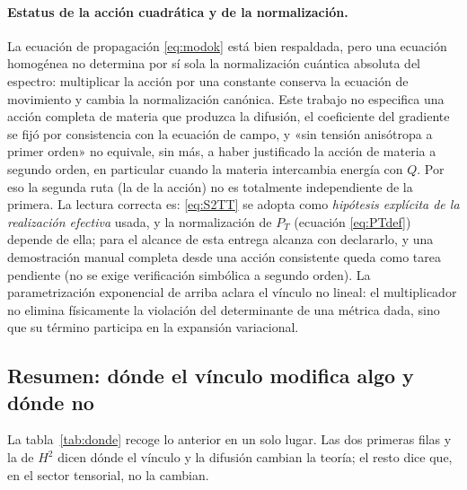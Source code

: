 \paragraph{Estatus de la acción cuadrática y de la normalización.} La ecuación de propagación \eqref{eq:modok} está bien respaldada, pero una ecuación homogénea no determina por sí sola la normalización cuántica absoluta del espectro: multiplicar la acción por una constante conserva la ecuación de movimiento y cambia la normalización canónica. Este trabajo no especifica una acción completa de materia que produzca la difusión, el coeficiente del gradiente se fijó por consistencia con la ecuación de campo, y «sin tensión anisótropa a primer orden» no equivale, sin más, a haber justificado la acción de materia a segundo orden, en particular cuando la materia intercambia energía con $Q$. Por eso la segunda ruta (la de la acción) no es totalmente independiente de la primera. La lectura correcta es: \eqref{eq:S2TT} se adopta como \emph{hipótesis explícita de la realización efectiva} usada, y la normalización de $P_T$ (ecuación \eqref{eq:PTdef}) depende de ella; para el alcance de esta entrega alcanza con declararlo, y una demostración manual completa desde una acción consistente queda como tarea pendiente (no se exige verificación simbólica a segundo orden). La parametrización exponencial de arriba aclara el vínculo no lineal: el multiplicador no elimina físicamente la violación del determinante de una métrica dada, sino que su término participa en la expansión variacional.

\subsection{Resumen: dónde el vínculo modifica algo y dónde no}

La tabla~\ref{tab:donde} recoge lo anterior en un solo lugar. Las dos primeras filas y la de $H^2$ dicen dónde el vínculo y la difusión cambian la teoría; el resto dice que, en el sector tensorial, no la cambian.

